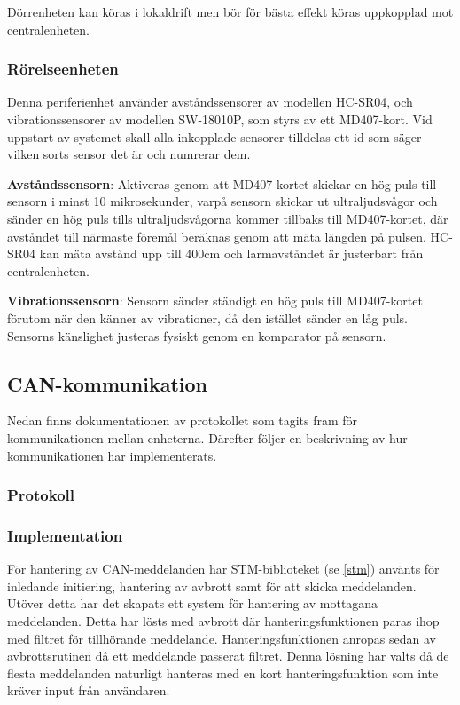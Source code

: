 \documentclass{article}
\begin{document}
Dörrenheten kan köras i lokaldrift men bör för bästa effekt köras uppkopplad mot centralenheten.\\
\subsubsection{Rörelseenheten}
Denna periferienhet använder avståndssensorer av modellen HC-SR04, och vibrationssensorer av modellen SW-18010P, som styrs av ett MD407-kort.
Vid uppstart av systemet skall alla inkopplade sensorer tilldelas ett id som säger vilken sorts sensor det är och numrerar dem.

\textbf{Avståndssensorn}: Aktiveras genom att MD407-kortet skickar en hög puls till sensorn i minst 10 mikrosekunder, 
 varpå sensorn skickar ut ultraljudsvågor och sänder en hög puls tills ultraljudsvågorna kommer tillbaks till MD407-kortet, där avståndet till närmaste föremål beräknas genom att mäta längden på pulsen. 
HC-SR04 kan mäta avstånd upp till 400cm och larmavståndet är justerbart från centralenheten.

\textbf{Vibrationssensorn}: Sensorn sänder ständigt en hög puls till MD407-kortet förutom när den känner av vibrationer, då den istället sänder en låg puls. 
Sensorns känslighet justeras fysiskt genom en komparator på sensorn.

\subsection{CAN-kommunikation}
\label{can}
Nedan finns dokumentationen av protokollet som tagits fram för
kommunikationen mellan enheterna. Därefter följer en beskrivning av hur kommunikationen har implementerats.
\subsubsection{Protokoll}

\subsubsection{Implementation}
För hantering av CAN-meddelanden har STM-biblioteket (se \ref{stm}) använts för inledande initiering, hantering av avbrott samt för att skicka meddelanden.
Utöver detta har det skapats ett system för hantering av mottagana meddelanden.
Detta har lösts med avbrott där hanteringsfunktionen paras ihop med filtret för tillhörande meddelande.
Hanteringsfunktionen anropas sedan av avbrottsrutinen då ett meddelande passerat filtret.
Denna lösning har valts då de flesta meddelanden naturligt hanteras med en kort hanteringsfunktion som inte kräver input från användaren.
\end{document}
